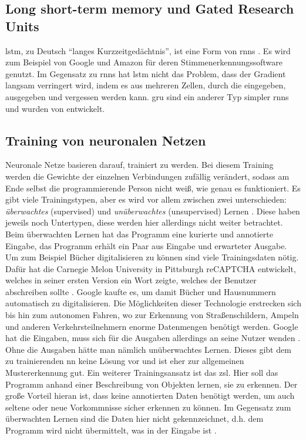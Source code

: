 \subsection{Long short-term memory und Gated Research Units}\label{sub:lstm}
\ac{lstm}, zu Deutsch \enquote{langes Kurzzeitgedächtnis}, ist eine Form von \acp{rnn} \citep{lstm}.
Es wird zum Beispiel von Google und Amazon für deren Stimmenerkennungssoftware genutzt.
Im Gegensatz zu \acp{rnn} hat \ac{lstm} nicht das Problem, dass der Gradient langsam verringert wird,
indem es aus mehreren Zellen, durch die eingegeben, ausgegeben und vergessen werden kann.
\ac{gru} sind ein anderer Typ simpler \acp{rnn} und wurden von \citet{gru} entwickelt.

\subsection{Training von neuronalen Netzen}
Neuronale Netze basieren darauf, trainiert zu werden.
Bei diesem Training werden die Gewichte der einzelnen Verbindungen zufällig verändert, sodass am Ende selbst die programmierende Person nicht weiß, wie genau es funktioniert.
Es gibt viele Trainingstypen, aber es wird vor allem zwischen zwei unterschieden: \emph{überwachtes} (supervised) und \emph{unüberwachtes} (unsupervised) Lernen \citep{mllearning}.
Diese haben jeweils noch Untertypen, diese werden hier allerdings nicht weiter betrachtet.
Beim überwachten Lernen hat das Programm eine kurierte und annotierte Eingabe, das Programm erhält ein Paar aus Eingabe und erwarteter Ausgabe.
Um zum Beispiel Bücher digitalisieren zu können sind viele Trainingsdaten nötig.
Dafür hat die Carnegie Melon University in Pittsburgh reCAPTCHA entwickelt, welches in seiner ersten Version ein Wort zeigte, welches der Benutzer abschreiben sollte \citep{recaptchabooks}.
Google kaufte es, um damit Bücher und Hausnummern automatisch zu digitalisieren.
Die Möglichkeiten dieser Technologie erstrecken sich bis hin zum autonomen Fahren, wo zur Erkennung von Straßenschildern, Ampeln und anderen Verkehrsteilnehmern enorme Datenmengen benötigt werden.
Google hat die Eingaben, muss sich für die Ausgaben allerdings an seine Nutzer wenden \citep{recaptchaav}.
Ohne die Ausgaben hätte man nämlich unüberwachtes Lernen.
Dieses gibt dem zu trainierenden \ac{nn} keine Lösung vor und ist eher zur allgemeinen Mustererkennung gut.
Ein weiterer Trainingsansatz ist das \ac{zsl}.
Hier soll das Programm anhand einer Beschreibung von Objekten lernen, sie zu erkennen.
Der große Vorteil hieran ist, dass keine annotierten Daten benötigt werden, um auch seltene oder neue Vorkommnisse sicher erkennen zu können.
Im Gegensatz zum überwachten Lernen sind die Daten hier nicht gekennzeichnet, d.h. dem Programm wird nicht übermittelt, was in der Eingabe ist \citep{zsl}.

